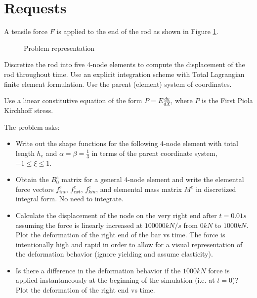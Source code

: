 \section{Requests}
\label{sec:requests}

A tensile force $F$ is applied to the end of the rod as shown in Figure \ref{fig:problem_representation}.

\begin{figure}[h]
    \centering
    \caption{Problem representation}
    \label{fig:problem_representation}
\end{figure}

Discretize the rod into five 4-node elements to compute the displacement of the rod throughout time.
Use an explicit integration scheme with Total Lagrangian finite element formulation.
Use the parent (element) system of coordinates.

Use a linear constitutive equation of the form $P = E \frac{du}{dX}$, where $P$ is the First Piola Kirchhoff stress.

The problem asks:

\begin{itemize}
    \item Write out the shape functions for the following 4-node element with total length $h_e$ and $\alpha = \beta = \frac{1}{3}$ in terms of the parent coordinate system, $-1 \leq \xi \leq 1$.
    \item Obtain the $B_0^e$ matrix for a general 4-node element and write the elemental force vectors $f_{int}^e$, $f_{ext}^e$, $f_{kin}^e$, and elemental mass matrix $M^e$ in discretized integral form. No need to integrate.
    \item Calculate the displacement of the node on the very right end after $t = 0.01s$ assuming the force is linearly increased at $100000 kN/s$ from $0 kN$ to $1000 kN$. Plot the deformation of the right end of the bar vs time. The force is intentionally high and rapid in order to allow for a visual representation of the deformation behavior (ignore yielding and assume elasticity).
    \item Is there a difference in the deformation behavior if the $1000 kN$ force is applied instantaneously at the beginning of the simulation (i.e. at $t=0$)? Plot the deformation of the right end vs time.
\end{itemize}

